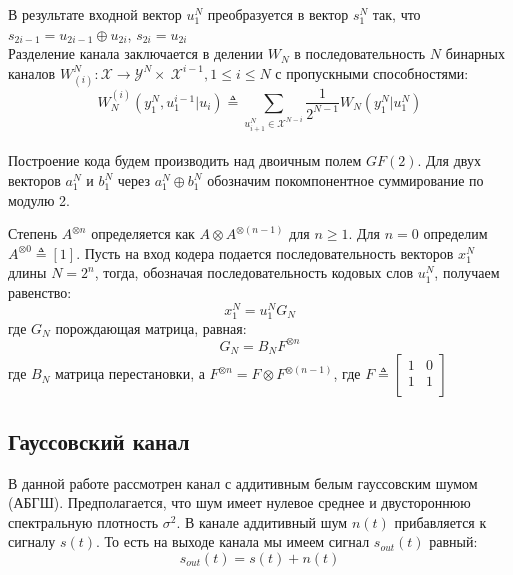 \documentclass{llncs}
\begin{document}
В результате входной вектор $u_1^N$ преобразуется в вектор $s_1^N$ так, что $s_{2i-1} = u_{2i-1} \oplus u_{2i}$, $s_{2i}=u_{2i} $
\\
Разделение канала заключается в делении $W_N$ в последовательность $N$ бинарных каналов $W_(i)^N : \mathcal{X} \rightarrow \mathcal{Y}^N \times \ \mathcal{X}^{i-1}, 1\leq i \leq N$ с пропускными способностями:
\begin{equation}
    W_N^{(i)}(y_1^N,u_1^{i-1}|u_i) \triangleq \sum\limits_{u^N_{i+1} \in\mathcal{X}^{N-i}} \frac{1}{2^{N-1}}W_N(y_1^N|u_1^N)
\end{equation}
\\ 
Построение кода будем производить над двоичным полем $GF(2)$. Для двух векторов $a_1^N$ и $b_1^N$ через $a_1^N \oplus b_1^N$ обозначим покомпонентное суммирование по модулю 2. 

Степень $A^{\otimes n}$ определяется как $A \otimes A^{\otimes (n-1)}$  для $n \geq 1$. Для $n = 0$ определим $A^{\otimes 0} \triangleq [1]$.
Пусть на вход кодера подается последовательность векторов $x^N_1$ длины $N = 2^n$, тогда, обозначая последовательность кодовых слов $u_1^N$, получаем равенство:
\begin{equation}
    x^N_1 = u_1^NG_N
\end{equation}
где $G_N$ порождающая матрица, равная:
\begin{equation}
    G_N = B_N F^{\otimes n}
\end{equation}
где $B_N$ матрица перестановки, а $F^{\otimes n} = F \otimes F^{\otimes (n-1)}$, где $F \triangleq  \begin{bmatrix}
1  & 0  \\
1  & 1 \\
\end{bmatrix} $
\subsection{Гауссовский канал}
В данной работе рассмотрен канал с аддитивным белым гауссовским шумом (АБГШ). Предполагается, что шум имеет нулевое среднее и двустороннюю спектральную плотность $\sigma^2 $.
В канале аддитивный шум $n(t)$  прибавляется к сигналу $s(t)$. То есть на выходе канала мы имеем сигнал $s_{out}(t)$ равный:
\begin{equation}
    s_{out}(t)=s(t)+n(t)
\end{equation}
\\
\end{document}
